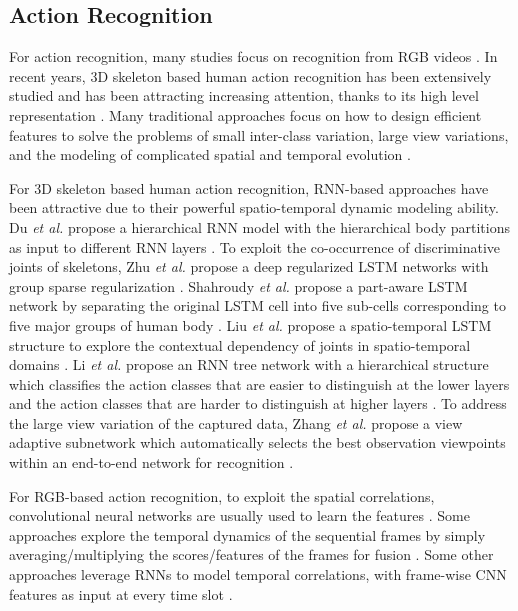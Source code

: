 \documentclass[runningheads]{llncs}
\begin{document}
{	\subsection {Action Recognition}
	\label{subsec:action}
	For action recognition, many studies focus on recognition from RGB videos \cite{wang2013action,simonyan2014two,donahue2015long,yue2015beyond,wang2016temporal}. In recent years, 3D skeleton based human action recognition has been extensively studied and has been attracting increasing attention, thanks to its high level representation \cite{han2017space}. Many traditional approaches focus on how to design efficient features to solve the problems of small inter-class variation, large view variations, and the modeling of complicated spatial and temporal evolution  \cite{wang2013action,wang2014cross,vemulapalli2014human,xia2012view,wang2012mining,wang2016graph}. 
	
	For 3D skeleton based human action recognition, RNN-based approaches have been attractive due to their powerful spatio-temporal dynamic modeling ability. Du {\it et al.} propose a hierarchical RNN model with the hierarchical body partitions as input to different RNN layers \cite{du2015hierarchical}. To exploit the co-occurrence of discriminative joints of skeletons, Zhu {\it et al.} propose a deep regularized LSTM networks with group sparse regularization \cite{zhu2016co}. Shahroudy {\it et al.} propose a part-aware LSTM network by separating the original LSTM cell into five sub-cells corresponding to five major groups of human body \cite{Shahroudy_2016_CVPR}. Liu {\it et al.} propose a spatio-temporal LSTM structure to explore the contextual dependency of joints in spatio-temporal domains \cite{liu2016spatio}. Li {\it et al.} propose an RNN tree network with a hierarchical structure which classifies the action classes that are easier to distinguish at the lower layers and the action classes that are harder to distinguish at higher layers \cite{li2017adaptive}. To address the large view variation of the captured data, Zhang {\it et al.} propose a view adaptive subnetwork which automatically selects the best observation viewpoints within an end-to-end network for recognition \cite{zhang2017view}. 
	
	For RGB-based action recognition, to exploit the spatial correlations, convolutional neural networks are usually used to learn the features \cite{simonyan2014two,wang2016temporal,yue2015beyond,donahue2015long}. Some approaches explore the temporal dynamics of the sequential frames by simply averaging/multiplying the scores/features of the frames for fusion \cite{simonyan2014two,wang2016temporal,diba2017deeptemporal}. Some other approaches leverage RNNs to model temporal correlations, with frame-wise CNN features as input at every time slot \cite{yue2015beyond,donahue2015long}. 
	
}
\end{document}
